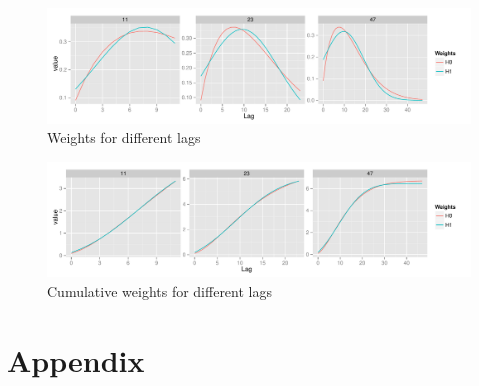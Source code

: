 \documentclass{article}
\begin{document}
\begin{figure}[t]
\begin{center}
\includegraphics{Output-fig1}
\end{center}
\caption{Weights for different lags}
\label{fig:one}
\end{figure}

\begin{figure}[hb]
\begin{center}
\includegraphics{Output-fig2}
\end{center}
\caption{Cumulative weights for different lags}
\label{fig:two}
\end{figure}

 
\section{Appendix}
\end{document}
